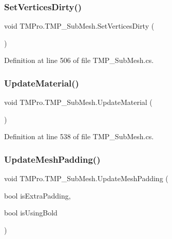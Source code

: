 \subsubsection{\texorpdfstring{SetVerticesDirty()}{SetVerticesDirty()}}
{\footnotesize\ttfamily void T\+M\+Pro.\+T\+M\+P\+\_\+\+Sub\+Mesh.\+Set\+Vertices\+Dirty (\begin{DoxyParamCaption}{ }\end{DoxyParamCaption})}







Definition at line 506 of file T\+M\+P\+\_\+\+Sub\+Mesh.\+cs.

\mbox{\label{class_t_m_pro_1_1_t_m_p___sub_mesh_a36148dca95029b37eed7ad450024d886}} 
\subsubsection{\texorpdfstring{UpdateMaterial()}{UpdateMaterial()}}
{\footnotesize\ttfamily void T\+M\+Pro.\+T\+M\+P\+\_\+\+Sub\+Mesh.\+Update\+Material (\begin{DoxyParamCaption}{ }\end{DoxyParamCaption})\hspace{0.3cm}{\ttfamily [protected]}}







Definition at line 538 of file T\+M\+P\+\_\+\+Sub\+Mesh.\+cs.

\mbox{\label{class_t_m_pro_1_1_t_m_p___sub_mesh_a5a77ba8ab35cf4a0570069b95527cbff}} 
\subsubsection{\texorpdfstring{UpdateMeshPadding()}{UpdateMeshPadding()}}
{\footnotesize\ttfamily void T\+M\+Pro.\+T\+M\+P\+\_\+\+Sub\+Mesh.\+Update\+Mesh\+Padding (\begin{DoxyParamCaption}\item[{bool}]{is\+Extra\+Padding,  }\item[{bool}]{is\+Using\+Bold }\end{DoxyParamCaption})}



